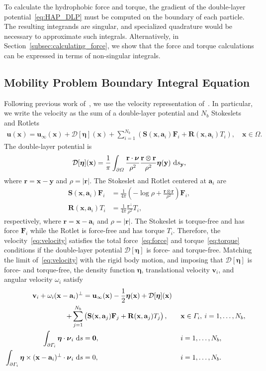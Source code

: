 \documentclass[lineno]{jfm}
\renewcommand{\aa}{\mathbf{a}}
\newcommand{\bd}{\partial}
\newcommand{\DD}{\mathcal{D}}
\newcommand{\eeta}{\boldsymbol{\eta}}
\newcommand{\FF}{\mathbf{F}}
\newcommand{\nnu}{\boldsymbol{\nu}}
\newcommand{\rr}{\mathbf{r}}
\newcommand{\RR}{\mathbf{R}}
\renewcommand{\SS}{\mathbf{S}}
\newcommand{\xx}{\mathbf{x}}
\newcommand{\uu}{\mathbf{u}}
\renewcommand{\vv}{\mathbf{v}}
\newcommand{\yy}{\mathbf{y}}
\begin{document}
To calculate the hydrophobic force and torque, the gradient of the
double-layer potential~\eqref{eq:HAP_DLP} must be computed on the
boundary of each particle. The resulting integrands are singular, and
specialized quadrature would be necessary to approximate such integrals.
Alternatively, in Section~\ref{subsec:calculating_force}, we show that
the force and torque calculations can be expressed in terms of
non-singular integrals.

\subsection{Mobility Problem Boundary Integral Equation}
Following previous work of~\cite{Lukas19}, we use the velocity
representation of~\cite{pow-mir1987}. In particular, we write the
velocity as the sum of a double-layer potential and $N_b$ Stokeslets and
Rotlets
\begin{align}
  \label{eq:velocity}
  \uu(\xx) = \uu_\infty(\xx) + \DD[\eeta](\xx) + 
    \sum_{i=1}^{N_b} \left(\SS(\xx,\aa_i) \FF_i + 
    \RR(\xx,\aa_i) T_i\right), \quad \xx \in \Omega.
\end{align}
The double-layer potential is
\begin{align}
  \DD[\eeta](\xx) = \frac{1}{\pi} \int_{\bd\Omega} 
    \frac{\rr \cdot \nnu}{\rho^2} \frac{\rr \otimes \rr}{\rho^2}
    \eeta(\yy) \, \dif s_\yy,
\end{align}
where $\rr = \xx - \yy$ and $\rho = |\rr|$. The Stokeslet and Rotlet
centered at $\aa_i$ are
\begin{align}
  \SS(\xx,\aa_i)\FF_i &= \frac{1}{4\pi} \left(-\log \rho + 
    \frac{\rr \otimes \rr}{\rho^2}\right) \FF_i, \\
  \RR(\xx,\aa_i)T_i &= \frac{1}{4\pi} \frac{\rr^\perp}{\rho^2} T_i,
\end{align}
respectively, where $\rr = \xx - \aa_i$ and $\rho = |\rr|$. The
Stokeslet is torque-free and has force $\FF_i$ while the Rotlet is
force-free and has torque $T_i$. Therefore, the
velocity~\eqref{eq:velocity} satisfies the total force~\eqref{eq:force}
and torque~\eqref{eq:torque} conditions if the double-layer potential
$\DD[\eeta]$ is force- and torque-free.  Matching the limit
of~\eqref{eq:velocity} with the rigid body motion, and imposing that
$\DD[\eeta]$ is force- and torque-free, the density function $\eeta$,
translational velocity $\vv_i$, and angular velocity $\omega_i$ satisfy
\begin{alignat}{3}
  \nonumber
  \vv_i + \omega_i (\xx - \aa_i)^\perp &= \uu_\infty(\xx)
    -\frac{1}{2} \eeta(\xx) + \DD[\eeta](\xx) \\
  \label{eq:SKIE}
    + \sum_{j=1}^{N_b} &
    \left(\SS(\xx,\aa_j) \FF_j + \RR(\xx,\aa_j) T_j\right),
    \quad &&\xx \in \Gamma_i,\: i=1,\ldots,N_b, \\
  \label{eq:mobility1}
  \int_{\bd\Gamma_i} \eeta \cdot \nnu_i \, \dif s &= {\bf 0}, 
  &&i = 1,\ldots,N_b, \\
  \label{eq:mobility2}
  \int_{\bd\Gamma_i} \eeta\times(\xx-\aa_i)^\perp \cdot \nnu_i \, \dif s &= 0,
  &&i = 1,\ldots,N_b.
\end{alignat}
\end{document}
